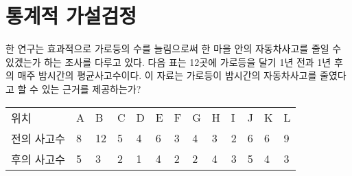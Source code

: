 \section{통계적 가설검정}
한 연구는 효과적으로 가로등의 수를 늘림으로써 한 마을 안의 자동차사고를
줄일 수 있겠는가 하는 조사를 다루고 있다. 다음 표는 12곳에 가로등을 달기
1년 전과 1년 후의 매주 밤시간의 평균사고수이다. 이 자료는 가로등이 밤시간의
자동차사고를 줄였다고 할 수 있는 근거를 제공하는가?

\begin{tabularx}{0.9\textwidth}{ l|XXXXXXXXXXXX }
  \noalign{\smallskip}\hline\noalign{\smallskip}
  위치 & A & B & C & D & E & F & G & H & I & J & K & L \\
  전의 사고수 &
    8 & 12 & 5 & 4 & 6 & 3 & 4 & 3 & 2 & 6 & 6 & 9 \\
  후의 사고수 &
    5 &  3 & 2 & 1 & 4 & 2 & 2 & 4 & 3 & 5 & 4 & 3
\end{tabularx}

